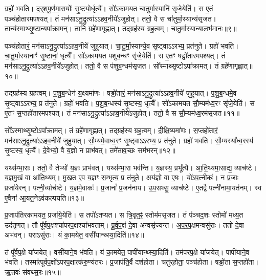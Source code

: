 ग्रहो॑ भवति।
द॒र्‌॒\mbox{}श॒पू॒र्ण॒मा॒सयोः᳚ सृ॒ष्टयो॒र्धृत्यै᳚।
सो॑ऽकामयत चातुर्मा॒स्यानि॑ सृजे॒येति॑।
स ए॒तं पञ्च॑होतारमपश्यत्।
तं मन॑सा\-ऽनु॒द्रुत्या॑\-ऽऽहव॒नीये॑\-ऽजुहोत्।
ततो॒ वै स चा॑तुर्मा॒स्यान्य॑\-सृजत।
तान्य॑स्माथ्सृ॒ष्टान्यपा᳚क्रामन्।
तानि॒ ग्रहे॑णागृह्णात्।
तद्ग्रह॑स्य ग्रह॒त्वम्।
चा॒तु॒र्मा॒स्यान्या॒लभ॑मानः॥९॥

पञ्च॑होतारं॒ मन॑सा\-ऽनु॒द्रुत्या॑\-ऽऽहव॒नीये॑ जुहुयात्।
चा॒तु॒र्मा॒स्या\-न्ये॒व सृ॒ष्ट्वा\-ऽऽरभ्य॒ प्रत॑नुते।
ग्रहो॑ भवति।
चा॒तु॒र्मा॒स्यानाꣳ॑ सृ॒ष्टानां॒ धृत्यै᳚।
सो॑ऽकामयत पशुब॒न्धꣳ सृ॑जे॒येति॑।
स ए॒तꣳ षड्ढो॑तारमपश्यत्।
तं मन॑सा\-ऽनु॒द्रुत्या॑\-ऽऽहव॒नीये॑\-ऽजुहोत्।
ततो॒ वै स प॑शुब॒न्धम॑\-सृजत।
सो᳚स्माथ्सृ॒ष्टो\-ऽपा᳚क्रामत्।
तं ग्रहे॑णागृह्णात्॥१०॥

तद्ग्रह॑स्य ग्रह॒त्वम्।
प॒शु॒ब॒न्धेन॑ य॒क्ष्यमा॑णः।
षड्ढो॑तारं॒ मन॑सा\-ऽनु॒द्रुत्या॑\-ऽऽहव॒नीये॑ जुहुयात्।
प॒शु॒ब॒न्धमे॒व सृ॒ष्ट्वा\-ऽऽरभ्य॒ प्र त॑नुते।
ग्रहो॑ भवति।
प॒शु॒ब॒न्धस्य॑ सृ॒ष्टस्य॒ धृत्यै᳚।
सो॑ऽकामयत सौ॒म्यम॑ध्व॒रꣳ सृ॑जे॒येति॑।
स ए॒तꣳ स॒प्तहो॑तारमपश्यत्।
तं मन॑सा\-ऽनु॒द्रुत्या॑\-ऽऽहव॒नीये॑\-ऽजुहोत्।
ततो॒ वै स सौ॒म्यम॑ध्व॒रम॑\-सृजत॥११॥

सो᳚ऽस्माथ्सृ॒ष्टो\-ऽपा᳚क्रामत्।
तं ग्रहे॑णागृह्णात्।
तद्ग्रह॑स्य ग्रह॒त्वम्।
दी॒क्षि॒ष्यमा॑णः।
स॒प्तहो॑तारं॒ मन॑सा\-ऽनु॒द्रुत्या॑\-ऽऽहव॒नीये॑ जुहुयात्।
सौ॒म्यमे॒वाध्व॒रꣳ सृ॒ष्ट्वा\-ऽऽरभ्य॒ प्र त॑नुते।
ग्रहो॑ भवति।
सौ॒म्यस्या᳚ध्व॒रस्य॑ सृ॒ष्टस्य॒ धृत्यै᳚।
दे॒वेभ्यो॒ वै य॒ज्ञो न प्राभ॑वत्।
तमे॑ताव॒च्छः सम॑भरन्॥१२॥

यथ्स॑म्भा॒राः।
ततो॒ वै तेभ्यो॑ य॒ज्ञः प्राभ॑वत्।
यथ्स॑म्भा॒रा भव॑न्ति।
य॒ज्ञस्य॒ प्रभू᳚त्यै।
आ॒ति॒थ्यमा॒साद्य॒ व्याच॑ष्टे।
य॒ज्ञ॒\-मु॒खं वा आ॑ति॒थ्यम्।
मु॒ख॒त ए॒व य॒ज्ञꣳ स॒म्भृत्य॒ प्र त॑नुते।
अय॑ज्ञो॒ वा ए॒षः।
यो॑ऽप॒त्नीकः॑।
न प्र॒जाः प्रजा॑येरन्।
पत्नी॒र्व्याच॑ष्टे।
य॒ज्ञमे॒वाकः॑।
प्र॒जानां᳚ प्र॒जन॑नाय।
उ॒प॒सथ्सु॒ व्याच॑ष्टे।
ए॒तद्वै पत्नी॑नामा॒यत॑नम्।
स्व ए॒वैना॑ आ॒यत॒ने\-ऽव॑कल्पयति॥१३॥\anuvakamend[त॒नु॒त॒ आ॒लभ॑मानो\-ऽगृह्णाद\-सृजताभरञ्जायेर॒न्थ्षट्च॑]

प्र॒जा\-प॑तिरकामयत॒ प्रजा॑ये॒येति॑।
स तपो॑\-ऽतप्यत।
स त्रि॒वृत॒ꣴ॒ स्तोम॑म\-सृजत।
तं प॑ञ्चद॒शः स्तोमो॑ मध्य॒त उद॑तृणत्।
तौ पू᳚र्वप॒क्षश्चा॑परप॒क्षश्चा॑भवताम्।
पू॒र्व॒प॒क्षं दे॒वा अन्वसृ॑ज्यन्त।
अ॒प॒र॒प॒क्षमन्वसु॑राः।
ततो॑ दे॒वा अभ॑वन्।
पराऽसु॑राः।
यं का॒मये॑त॒ वसी॑यान्थ्स्या॒दिति॑॥१४॥

तं पू᳚र्वप॒क्षे या॑जयेत्।
वसी॑याने॒व भ॑वति।
यं का॒मये॑त॒ पापी॑यान्थ्स्या॒दिति॑।
तम॑परप॒क्षे या॑जयेत्।
पापी॑याने॒व भ॑वति।
तस्मा᳚त्पूर्वप॒क्षो॑\-ऽपरप॒क्षात्क॑रु॒ण्य॑तरः।
प्र॒जा\-प॑ति॒र्वै दश॑होता।
चतु॑र्‌\mbox{}होता॒ पञ्च॑होता।
षड्ढो॑ता स॒प्तहो॑ता।
ऋ॒तवः॑ संवथ्स॒रः॥१५॥

